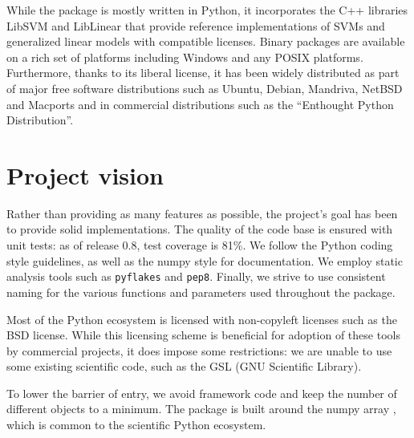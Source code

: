 \documentclass[twoside,11pt]{article}
\begin{document}
While the package is mostly written in Python, it incorporates the C++
libraries LibSVM \citep{chang2001} and LibLinear \citep{fan2008} that
provide reference implementations of SVMs and generalized linear models
with compatible licenses.
%
Binary packages are available on a rich set of platforms including
Windows and any POSIX platforms. Furthermore, thanks to its liberal
license, it has been widely distributed as part
of major free software distributions such as Ubuntu, Debian, Mandriva,
NetBSD and Macports and in commercial distributions such as the ``Enthought
Python Distribution''.




\section {Project vision}

%
Rather than providing as many features as possible, the project's goal has been to provide solid
implementations. The quality of the code base is ensured with unit
tests: as of release 0.8, test coverage is 81\%. We follow the
Python
coding style guidelines, as well as the numpy style for documentation. We
employ static analysis tools such as {\tt pyflakes} and {\tt pep8}.
Finally, we strive to use consistent naming for the various functions
and parameters used throughout the package.

\smallskip {}
%
Most of the Python ecosystem is licensed with non-copyleft licenses such
as the BSD license. While this licensing scheme is beneficial for adoption
of these tools by commercial
projects, it does impose some restrictions: we are unable to use some existing
scientific code, such as the GSL (GNU Scientific Library).

\smallskip {}
%
To lower the barrier of entry, we avoid framework code and keep the number
of different objects to a minimum.
The package is built
around the numpy array \citep{Vanderwalt2011}, which is common to the
scientific Python ecosystem.
\end{document}
